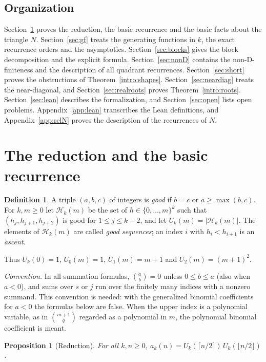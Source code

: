 \documentclass[11pt]{amsart}
\newtheorem{proposition}[theorem]{Proposition}
\theoremstyle{definition}
\newtheorem{definition}[theorem]{Definition}
\begin{document}
\subsection{Organization}
Section~\ref{sec:prelim} proves the reduction, the basic recurrence and the basic facts about the triangle $N$. Section~\ref{sec:gf} treats the generating functions in $k$, the exact recurrence orders and the asymptotics. Section~\ref{sec:blocks} gives the block decomposition and the explicit formula. Section~\ref{sec:nonD} contains the non-D-finiteness and the description of all quadrant recurrences. Section~\ref{sec:short} proves the obstructions of Theorem~\ref{intro:shapes}. Section~\ref{sec:neardiag} treats the near-diagonal, and Section~\ref{sec:realroots} proves Theorem~\ref{intro:roots}. Section~\ref{sec:lean} describes the formalization, and Section~\ref{sec:open} lists open problems. Appendix~\ref{app:lean} transcribes the Lean definitions, and Appendix~\ref{app:relN} proves the description of the recurrences of $N$.

\section{The reduction and the basic recurrence}\label{sec:prelim}

\begin{definition}\label{def:good}
A triple $(a,b,c)$ of integers is \emph{good} if $b=c$ or $a\ge\max(b,c)$. For $k,m\ge0$ let $\mathcal H_k(m)$ be the set of $h\in\{0,\dots,m\}^k$ such that $(h_j,h_{j+1},h_{j+2})$ is good for $1\le j\le k-2$, and let $U_k(m)=|\mathcal H_k(m)|$. The elements of $\mathcal H_k(m)$ are called \emph{good sequences}; an index $i$ with $h_i<h_{i+1}$ is an \emph{ascent}.
\end{definition}

Thus $U_k(0)=1$, $U_0(m)=1$, $U_1(m)=m+1$ and $U_2(m)=(m+1)^2$.

\emph{Convention.} In all summation formulas, $\binom{a}{b}=0$ unless $0\le b\le a$ (also when $a<0$), and sums over $s$ or $j$ run over the finitely many indices with a nonzero summand. This convention is needed: with the generalized binomial coefficients for $a<0$ the formulas below are false. When the upper index is a polynomial variable, as in $\binom{m+1}{q}$ regarded as a polynomial in $m$, the polynomial binomial coefficient is meant.

\begin{proposition}[Reduction]\label{prop:reduction}
For all $k,n\ge0$, $a_k(n)=U_k(\lceil n/2\rceil)\,U_k(\lfloor n/2\rfloor)$.
\end{proposition}
\end{document}
